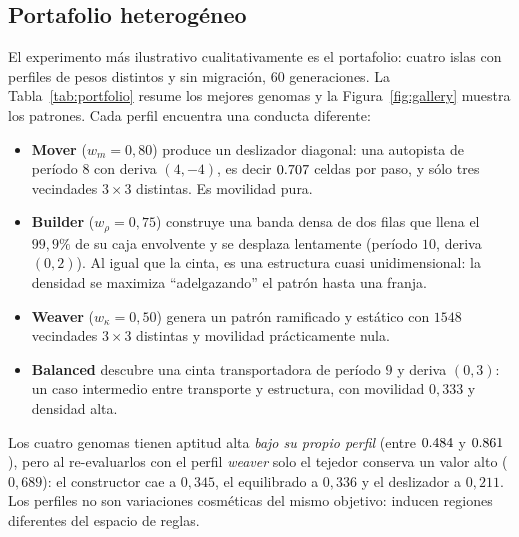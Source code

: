 \documentclass[11pt,a4paper]{article}
\begin{document}
\subsection{Portafolio heterog\'eneo}

El experimento m\'as ilustrativo cualitativamente es el portafolio: cuatro islas
con perfiles de pesos distintos y sin migraci\'on, $60$ generaciones.  La
Tabla~\ref{tab:portfolio} resume los mejores genomas y la
Figura~\ref{fig:gallery} muestra los patrones.  Cada perfil encuentra una
conducta diferente:
\begin{itemize}
  \item \textbf{Mover} ($w_m=0{,}80$) produce un deslizador diagonal: una
        autopista de per\'iodo $8$ con deriva $(4,-4)$, es decir
        $0.707$ celdas por paso, y s\'olo tres vecindades
        $3\times3$ distintas.  Es movilidad pura.
  \item \textbf{Builder} ($w_\rho=0{,}75$) construye una banda densa de dos
        filas que llena el $99{,}9\%$ de su caja envolvente y se desplaza
        lentamente (per\'iodo $10$, deriva $(0,2)$).  Al igual que la cinta, es
        una estructura cuasi unidimensional: la densidad se maximiza
        ``adelgazando'' el patr\'on hasta una franja.
  \item \textbf{Weaver} ($w_\kappa=0{,}50$) genera un patr\'on ramificado y
        est\'atico con $1548$ vecindades $3\times3$ distintas y movilidad
        pr\'acticamente nula.
  \item \textbf{Balanced} descubre una cinta transportadora de per\'iodo $9$ y
        deriva $(0,3)$: un caso intermedio entre transporte y estructura, con
        movilidad $0{,}333$ y densidad alta.
\end{itemize}

Los cuatro genomas tienen aptitud alta \emph{bajo su propio perfil} (entre
$0.484$ y $0.861$), pero al re-evaluarlos con el
perfil \emph{weaver} solo el tejedor conserva un valor alto ($0{,}689$): el
constructor cae a $0{,}345$, el equilibrado a $0{,}336$ y el deslizador a
$0{,}211$.  Los perfiles no son variaciones cosm\'eticas del mismo objetivo:
inducen regiones diferentes del espacio de reglas.

\begin{table}[t]
\centering
\caption{Portafolio heterog\'eneo: mejor genoma por perfil tras $60$
generaciones.  La \'ultima columna indica per\'iodo y deriva cuando el
an\'alisis detecta una autopista.}
\label{tab:portfolio}
\resizebox{\linewidth}{!}{}
\end{table}
\end{document}
